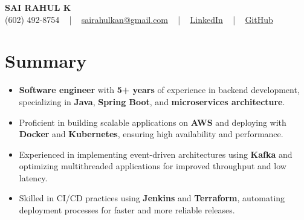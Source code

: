 \documentclass[letterpaper,11pt]{article}
\newcommand{\resumeItem}[1]{
  \item\footnotesize{
    {#1 \vspace{-2pt}}
  }
}
\newcommand{\resumeItemListStart}{\begin{itemize}[leftmargin=*]}
\newcommand{\resumeItemListEnd}{\end{itemize}\vspace{-5pt}}
\begin{document}
\begin{center}
    {\fontsize{14pt}{12pt}\selectfont \textbf{\MakeUppercase{Sai Rahul K}}}\\ \vspace{2pt}
    \fontsize{10pt}{12pt}\selectfont (602) 492-8754 ~ | ~ \href{mailto:sairahulkan@gmail.com}{sairahulkan@gmail.com} ~ | ~
    \href{https://www.linkedin.com/in/rq123/}{\color{blue}\underline{LinkedIn}} ~ | ~
    \href{https://github.com/kanrahuldo}{\color{blue}\underline{GitHub}}~
    \vspace{-8pt}
\end{center}

\section{Summary}
\fontsize{9pt}{10pt}\selectfont
\resumeItemListStart
    \resumeItem{\textbf{Software engineer} with \textbf{5+ years} of experience in backend development, specializing in \textbf{Java}, \textbf{Spring Boot}, and \textbf{microservices architecture}.} \vspace{-3pt}
    \resumeItem{Proficient in building scalable applications on \textbf{AWS} and deploying with \textbf{Docker} and \textbf{Kubernetes}, ensuring high availability and performance.} \vspace{-3pt}
    \resumeItem{Experienced in implementing event-driven architectures using \textbf{Kafka} and optimizing multithreaded applications for improved throughput and low latency.} \vspace{-3pt}
    \resumeItem{Skilled in CI/CD practices using \textbf{Jenkins} and \textbf{Terraform}, automating deployment processes for faster and more reliable releases.} \vspace{-3pt}
\resumeItemListEnd
\vspace{-6pt}
\end{document}
